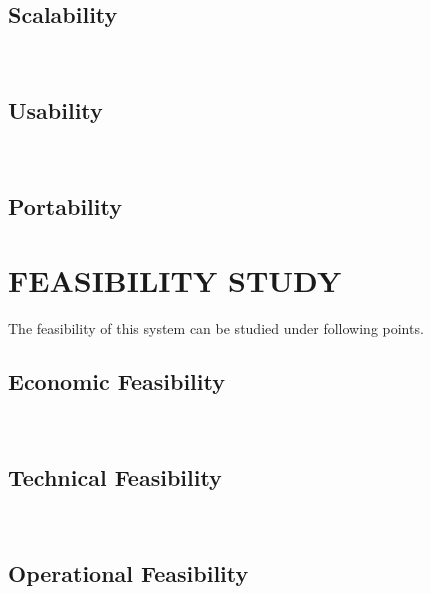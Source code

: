 \subsection{Scalability}
\lipsum[1]\\
\subsection{Usability}
\lipsum[1]\\
\subsection{Portability}
\lipsum[1]
\newpage
\section{FEASIBILITY STUDY}
The feasibility of this system can be studied under following points.
\subsection{Economic Feasibility}
\lipsum[1]\\
\subsection{Technical Feasibility}
\lipsum[1]\\
\subsection{Operational Feasibility}
\lipsum[1]
\newpage
